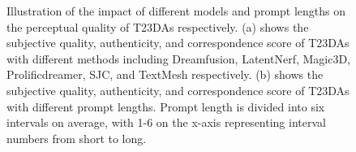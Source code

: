\begin{figure}[ht]
    \centering


                
    \caption{Illustration of the impact of different models and prompt lengths on the perceptual quality of T23DAs respectively. (a) shows the subjective quality, authenticity, and correspondence score of T23DAs with different methods including Dreamfusion, LatentNerf, Magic3D, Prolificdreamer, SJC, and TextMesh respectively. (b) shows the subjective quality, authenticity, and correspondence score of T23DAs with different prompt lengths. Prompt length is divided into six intervals on average, with 1-6 on the x-axis representing interval numbers from short to long.}
    \label{fig:moscompare}
    \vspace{-0.6cm}
\end{figure}
